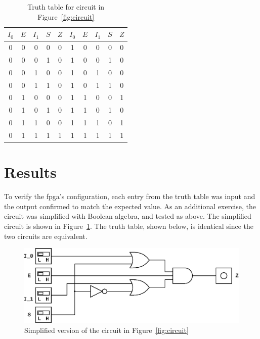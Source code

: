 \documentclass{article}
\begin{document}
\begin{table}[hbtp]
  \label{tab:truth}
  \centering
  \begin{tabular}{cccc|c || cccc|c}
    $I_0$ & $E$ & $I_1$ & $S$ & $Z$ & $I_0$ & $E$ & $I_1$ & $S$ & $Z$ \\
    \hline
    0 & 0 & 0 & 0 & 0 & 1 & 0 & 0 & 0 & 0 \\
    0 & 0 & 0 & 1 & 0 & 1 & 0 & 0 & 1 & 0 \\
    0 & 0 & 1 & 0 & 0 & 1 & 0 & 1 & 0 & 0 \\
    0 & 0 & 1 & 1 & 0 & 1 & 0 & 1 & 1 & 0 \\
    0 & 1 & 0 & 0 & 0 & 1 & 1 & 0 & 0 & 1 \\
    0 & 1 & 0 & 1 & 0 & 1 & 1 & 0 & 1 & 0 \\
    0 & 1 & 1 & 0 & 0 & 1 & 1 & 1 & 0 & 1 \\
    0 & 1 & 1 & 1 & 1 & 1 & 1 & 1 & 1 & 1 \\
  \end{tabular}
  \caption{Truth table for circuit in Figure~\ref{fig:circuit}}
\end{table}

\section{Results}
\label{sec:results}
To verify the \gls{fpga}'s configuration, each entry from the truth
table was input and the output confirmed to match the expected value.
As an additional exercise, the circuit was simplified with Boolean
algebra, and tested as above.  The simplified circuit is shown in
Figure~\ref{fig:circuit_simp}.  The truth table, shown below, is
identical since the two circuits are equivalent.

\begin{figure}[hbtp]
  \centering
  \includegraphics[width=\textwidth]{img/circuit_simp}
  \caption{Simplified version of the circuit in Figure~\ref{fig:circuit}}
  \label{fig:circuit_simp}
\end{figure}
\end{document}
